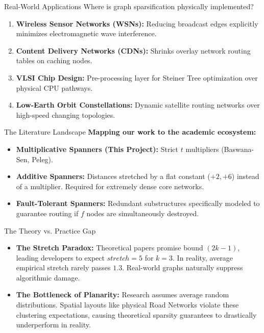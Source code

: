 \documentclass[aspectratio=169]{beamer}
\begin{document}
\begin{frame}{Real-World Applications}
    Where is graph sparsification physically implemented?
    \vspace{0.4cm}
    \begin{enumerate}
        \item \textbf{Wireless Sensor Networks (WSNs):} Reducing broadcast edges explicitly minimizes electromagnetic wave interference.
        \item \textbf{Content Delivery Networks (CDNs):} Shrinks overlay network routing tables on caching nodes.
        \item \textbf{VLSI Chip Design:} Pre-processing layer for Steiner Tree optimization over physical CPU pathways.
        \item \textbf{Low-Earth Orbit Constellations:} Dynamic satellite routing networks over high-speed changing topologies.
    \end{enumerate}
\end{frame}

\begin{frame}{The Literature Landscape}
    \textbf{Mapping our work to the academic ecosystem:}
    \vspace{0.4cm}
    \begin{itemize}
        \item \textbf{Multiplicative Spanners (This Project):} Strict $t$ multipliers (Baswana-Sen, Peleg).
        \item \textbf{Additive Spanners:} Distances stretched by a flat constant ($+2, +6$) instead of a multiplier. Required for extremely dense core networks.
        \item \textbf{Fault-Tolerant Spanners:} Redundant substructures specifically modeled to guarantee routing if $f$ nodes are simultaneously destroyed.
    \end{itemize}
\end{frame}

\begin{frame}{The Theory vs. Practice Gap}
    \begin{itemize}
        \item \textbf{The Stretch Paradox:} Theoretical papers promise bound $(2k-1)$, leading developers to expect $stretch=5$ for $k=3$. In reality, average empirical stretch rarely passes $1.3$. Real-world graphs naturally suppress algorithmic damage.
        \item \textbf{The Bottleneck of Planarity:} Research assumes average random distributions. Spatial layouts like physical Road Networks violate these clustering expectations, causing theoretical sparsity guarantees to drastically underperform in reality.
    \end{itemize}
\end{frame}
\end{document}
